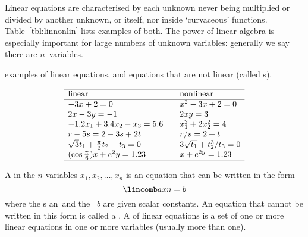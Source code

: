Linear equations are characterised by each unknown never being multiplied or divided by another unknown, or itself, nor inside `curvaceous' functions.  
Table~\ref{tbl:linnonlin} lists examples of both.
The power of linear algebra is especially important for large numbers of unknown variables: generally we say there are \(n\)~variables.
\begin{table}
\caption{examples of linear equations, and equations that are not linear (called s).}
\label{tbl:linnonlin}
\begin{equation*}
\begin{array}{l@{\qquad}l}\hline
\text{linear}&\text{nonlinear}\\\hline
-3x+2=0 & x^2-3x+2=0 \\
2x-3y=-1 & 2xy=3\\
-1.2x_1+3.4x_2-x_3=5.6 & x_1^2+2x_2^2=4 \\
r-5s=2-3s+2t & r/s=2+t \\
\sqrt3t_1+\frac\pi2t_2-t_3=0 & 3\sqrt{t_1}+t_2^3/t_3=0\\
(\cos\frac\pi6)x+e^2y=1.23 & x+e^{2y}=1.23\\
\hline
\end{array}
\end{equation*}
\end{table}




\begin{definition} \label{def:lineqn} 
A  in the \(n\) variables \(x_1,x_2,\ldots,x_n\) is an equation that can be written in the form
\begin{equation*}
\lincomb axn=b
\end{equation*}
where the s \hlist an\ and the ~\(b\) are given scalar constants.
An equation that cannot be written in this form is called a .
A  of linear equations is a set of one or more linear equations in one or more variables (usually more than one).
\end{definition}


